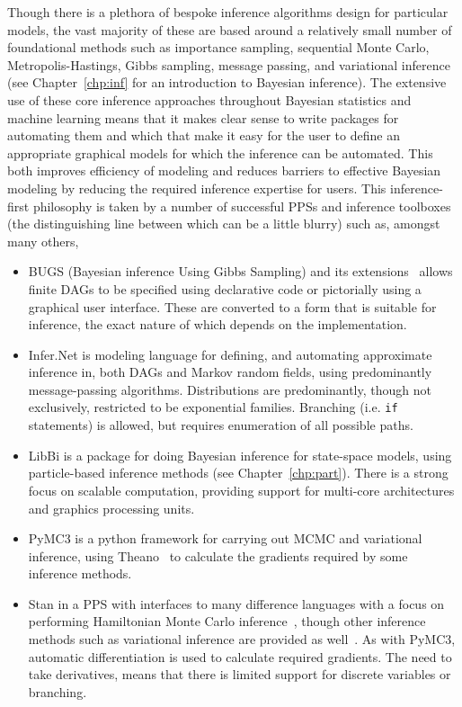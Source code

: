 Though there is a plethora of bespoke inference algorithms design for particular models, the vast majority of these are based around
a relatively small number of foundational methods such as importance sampling, sequential Monte Carlo,
Metropolis-Hastings, Gibbs sampling, message passing, and variational inference (see Chapter~\ref{chp:inf}
for an introduction to Bayesian inference).
The extensive use of these core inference approaches throughout Bayesian statistics and machine
learning means that it makes clear sense to write packages for automating them and which
that make it easy for the user to define an appropriate graphical models for which the inference can be automated.
This both improves efficiency of modeling and reduces barriers to effective Bayesian modeling by reducing the
required inference expertise for users.  This inference-first philosophy is taken by a number of successful PPSs
and inference toolboxes (the distinguishing line between which can be a little blurry) such as, amongst many others,
\begin{itemize}
	\item BUGS (Bayesian inference Using Gibbs Sampling) \citep{spiegelhalter1996bugs} and its 
	extensions~\citep{lunn2000winbugs,plummer2003jags,todeschini2014biips}
	allows finite DAGs to be specified using declarative code or pictorially using a graphical user
	interface.  These are converted to a form that is suitable for inference, the exact nature of which
	depends on the implementation.
	\item Infer.Net \citep{minka_software_2010} is modeling language for defining, and automating approximate inference in,
	both DAGs and Markov random fields, using predominantly message-passing algorithms. Distributions
	are predominantly, though not exclusively, restricted to be exponential families.  Branching (i.e. \texttt{if} statements) 
	is allowed, but requires enumeration of all possible paths.
	\item LibBi \citep{murray2013bayesian} is a package for doing Bayesian inference for state-space models,
	using particle-based inference methods (see Chapter~\ref{chp:part}).  There is a strong focus on scalable
	computation, providing support for multi-core architectures and graphics processing units.
	\item PyMC3 \citep{salvatier2016probabilistic} is a python framework for carrying out MCMC and variational
	inference, using Theano~\citep{bergstra2010theano} to calculate the gradients required by some inference methods.
	\item Stan \citep{carpenter2015stan} in a PPS with interfaces to many difference languages with a
	focus on performing Hamiltonian Monte Carlo inference~\citep{duane1987hybrid,hoffman2014no}, though
	other inference methods such as variational inference are provided as well~\citep{kucukelbir2015automatic}.
	As with PyMC3, automatic differentiation is used to calculate required gradients.  The need to take
	derivatives, means that there is limited support for discrete variables or branching.
\end{itemize}
